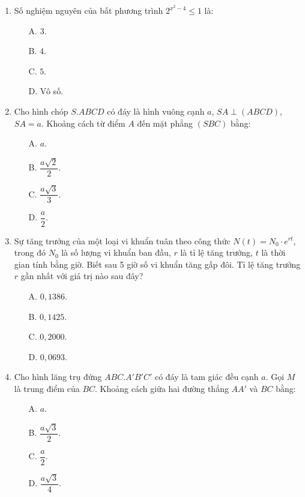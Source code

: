\documentclass[12pt, a4paper]{article}
\begin{document}
\begin{enumerate}[leftmargin=0.8cm]
    \item Số nghiệm nguyên của bất phương trình $2^{x^2 - 4} \le 1$ là:
    \begin{enumerate}[leftmargin=0.6cm]
        \item[A.] $3$.
        \item[B.] $4$.
        \item[C.] $5$.
        \item[D.] Vô số.
    \end{enumerate}

    \item Cho hình chóp $S.ABCD$ có đáy là hình vuông cạnh $a$, $SA \perp (ABCD)$, $SA = a$. Khoảng cách từ điểm $A$ đến mặt phẳng $(SBC)$ bằng:
    \begin{enumerate}[leftmargin=0.6cm]
        \item[A.] $a$.
        \item[B.] $\dfrac{a\sqrt{2}}{2}$.
        \item[C.] $\dfrac{a\sqrt{3}}{3}$.
        \item[D.] $\dfrac{a}{2}$.
    \end{enumerate}

    \item Sự tăng trưởng của một loại vi khuẩn tuân theo công thức $N(t) = N_0 \cdot e^{r t}$, trong đó $N_0$ là số lượng vi khuẩn ban đầu, $r$ là tỉ lệ tăng trưởng, $t$ là thời gian tính bằng giờ. Biết sau 5 giờ số vi khuẩn tăng gấp đôi. Tỉ lệ tăng trưởng $r$ gần nhất với giá trị nào sau đây?
    \begin{enumerate}[leftmargin=0.6cm]
        \item[A.] $0{,}1386$.
        \item[B.] $0{,}1425$.
        \item[C.] $0{,}2000$.
        \item[D.] $0{,}0693$.
    \end{enumerate}

    \item Cho hình lăng trụ đứng $ABC.A'B'C'$ có đáy là tam giác đều cạnh $a$. Gọi $M$ là trung điểm của $BC$. Khoảng cách giữa hai đường thẳng $AA'$ và $BC$ bằng:
    \begin{enumerate}[leftmargin=0.6cm]
        \item[A.] $a$.
        \item[B.] $\dfrac{a\sqrt{3}}{2}$.
        \item[C.] $\dfrac{a}{2}$.
        \item[D.] $\dfrac{a\sqrt{3}}{4}$.
    \end{enumerate}
\end{enumerate}
\end{document}
